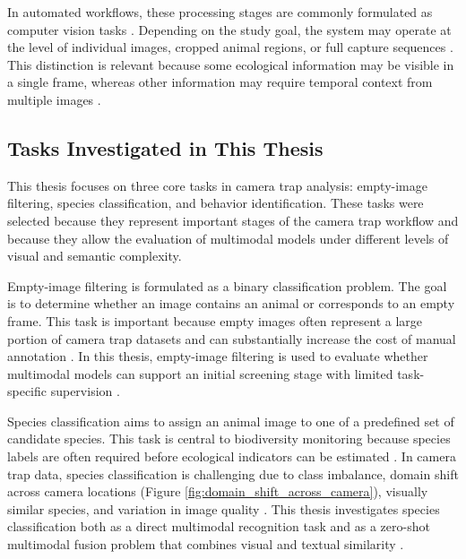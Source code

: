 In automated workflows, these processing stages are commonly formulated as computer vision tasks \cite{velez2023evaluation}. Depending on the study goal, the system may operate at the level of individual images, cropped animal regions, or full capture sequences \cite{gadot2024crop}. This distinction is relevant because some ecological information may be visible in a single frame, whereas other information may require temporal context from multiple images \cite{liu2024improved}.

\subsection{Tasks Investigated in This Thesis}

This thesis focuses on three core tasks in camera trap analysis: empty-image filtering, species classification, and behavior identification. These tasks were selected because they represent important stages of the camera trap workflow and because they allow the evaluation of multimodal models under different levels of visual and semantic complexity.

Empty-image filtering is formulated as a binary classification problem. The goal is to determine whether an image contains an animal or corresponds to an empty frame. This task is important because empty images often represent a large portion of camera trap datasets and can substantially increase the cost of manual annotation \cite{yang2021systematic, alencar2023context}. In this thesis, empty-image filtering is used to evaluate whether multimodal models can support an initial screening stage with limited task-specific supervision \cite{alencar2024zero}.

Species classification aims to assign an animal image to one of a predefined set of candidate species. This task is central to biodiversity monitoring because species labels are often required before ecological indicators can be estimated \cite{tabak2019machine}. In camera trap data, species classification is challenging due to class imbalance, domain shift across camera locations (Figure \ref{fig:domain_shift_across_camera}), visually similar species, and variation in image quality \cite{beery2018recognition, schneider2020three, cunha2023bag}. This thesis investigates species classification both as a direct multimodal recognition task and as a zero-shot multimodal fusion problem that combines visual and textual similarity \cite{alencar2026advancing, alencar2026zero}.

